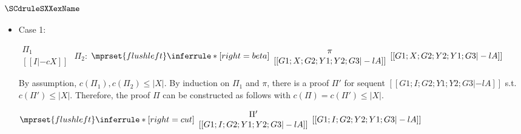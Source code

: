 \subsubsection{$\SCdruleSXXexName$}
\begin{itemize}
\item Case 1:
      \begin{center}
        \scriptsize
        \begin{math}
          \begin{array}{c}
            \Pi_1 \\
            {[[I |-c X]]}
          \end{array}
        \end{math}
        \qquad\qquad
        $\Pi_2$:
        \begin{math}
          $$\mprset{flushleft}
          \inferrule* [right={\tiny beta}] {
            {
              \begin{array}{c}
                \pi \\
                {[[G1; X; G2; Y1; Y2; G3 |-l A]]}
              \end{array}
            }
          }{[[G1; X; G2; Y2; Y1; G3 |-l A]]}
        \end{math}
      \end{center}
      By assumption, $c(\Pi_1),c(\Pi_2)\leq |X|$. By induction on $\Pi_1$
      and $\pi$, there is a proof $\Pi'$ for sequent
      $[[G1; I; G2; Y1; Y2; G3 |-l A]]$ s.t. $c(\Pi') \leq |X|$. Therefore,
      the proof $\Pi$ can be constructed as follows with
      $c(\Pi) = c(\Pi') \leq |X|$.
      \begin{center}
        \scriptsize
        \begin{math}
          $$\mprset{flushleft}
          \inferrule* [right={\tiny cut}] {
            {
              \begin{array}{cc}
                \Pi' \\
                {[[G1; I; G2; Y1; Y2; G3 |-l A]]}
              \end{array}
            }
          }{[[G1; I; G2; Y2; Y1; G3 |-l A]]}
        \end{math}
      \end{center}


\end{itemize}
